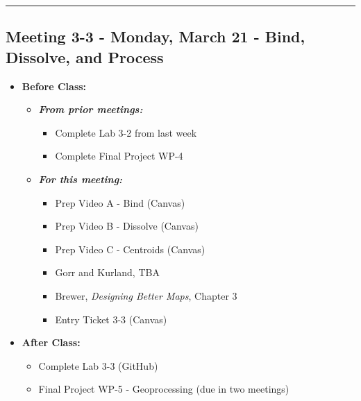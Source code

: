 \documentclass[
]{book}
\providecommand{\tightlist}{%
  \setlength{\itemsep}{0pt}\setlength{\parskip}{0pt}}
\begin{document}
\begin{center}\rule{0.5\linewidth}{0.5pt}\end{center}

\hypertarget{meeting-3-3---monday-march-21---bind-dissolve-and-process}{%
\subsection*{Meeting 3-3 - Monday, March 21 - Bind, Dissolve, and Process}\label{meeting-3-3---monday-march-21---bind-dissolve-and-process}}

\begin{itemize}
\tightlist
\item
  \textbf{Before Class:}

  \begin{itemize}
  \tightlist
  \item
    \textbf{\emph{From prior meetings:}}

    \begin{itemize}
    \tightlist
    \item
      Complete Lab 3-2 from last week
    \item
      Complete Final Project WP-4
    \end{itemize}
  \item
    \textbf{\emph{For this meeting:}}

    \begin{itemize}
    \tightlist
    \item
      Prep Video A - Bind (Canvas)
    \item
      Prep Video B - Dissolve (Canvas)
    \item
      Prep Video C - Centroids (Canvas)
    \item
      Gorr and Kurland, TBA
    \item
      Brewer, \emph{Designing Better Maps}, Chapter 3
    \item
      Entry Ticket 3-3 (Canvas)
    \end{itemize}
  \end{itemize}
\item
  \textbf{After Class:}

  \begin{itemize}
  \tightlist
  \item
    Complete Lab 3-3 (GitHub)
  \item
    Final Project WP-5 - Geoprocessing (due in two meetings)
  \end{itemize}
\end{itemize}
\end{document}
